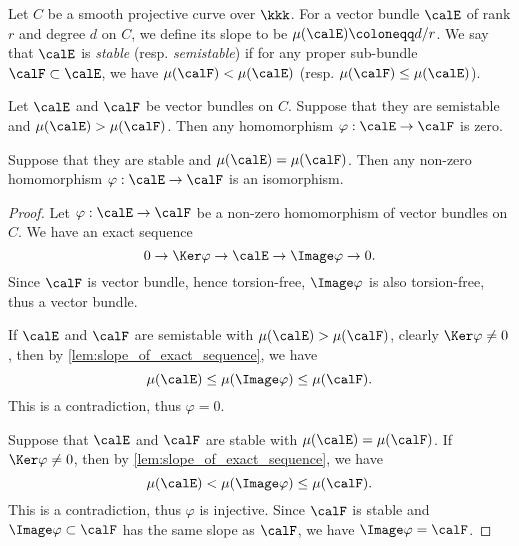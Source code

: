     \begin{definition}\label{def:stable_and_semistable_vector_bundles_over_curves}
        Let \(C\) be a smooth projective curve over \(\kkk\).
        For a vector bundle \(\calE\) of rank \(r\) and degree \(d\) on \(C\), we define its slope to be \(\mu(\calE) \coloneqq d/r\).
        We say that \(\calE\) is \emph{stable} (resp. \emph{semistable}) if for any proper sub-bundle \(\calF \subset \calE\), we have \(\mu(\calF) < \mu(\calE)\) (resp. \(\mu(\calF) \leq \mu(\calE)\)).
    \end{definition}

    \begin{proposition}\label{prop:homomorphism_between_semistable_and_stable_bundles}
        Let \(\calE\) and \(\calF\) be vector bundles on \(C\).
        Suppose that they are semistable and \(\mu(\calE) > \mu(\calF)\).
        Then any homomorphism \(\varphi : \calE \to \calF\) is zero.

        Suppose that they are stable and \(\mu(\calE) = \mu(\calF)\).
        Then any non-zero homomorphism \(\varphi : \calE \to \calF\) is an isomorphism.
    \end{proposition}
    \begin{proof}
        Let \(\varphi : \calE \to \calF\) be a non-zero homomorphism of vector bundles on \(C\).
        We have an exact sequence
        \[ 0 \to \Ker \varphi \to \calE \to \Image \varphi \to 0. \]
        Since \(\calF\) is vector bundle, hence torsion-free, \(\Image \varphi\) is also torsion-free, thus a vector bundle.

        If \(\calE\) and \(\calF\) are semistable with \(\mu(\calE) > \mu(\calF)\), 
        clearly \(\Ker \varphi \neq 0\), then by \cref{lem:slope_of_exact_sequence}, we have
        \[ \mu(\calE) \leq \mu(\Image \varphi) \leq \mu(\calF). \]
        This is a contradiction, thus \(\varphi = 0\).

        Suppose that \(\calE\) and \(\calF\) are stable with \(\mu(\calE) = \mu(\calF)\).
        If \(\Ker \varphi \neq 0\), then by \cref{lem:slope_of_exact_sequence}, we have
        \[ \mu(\calE) < \mu(\Image \varphi) \leq \mu(\calF). \]
        This is a contradiction, thus \(\varphi\) is injective.
        Since \(\calF\) is stable and \(\Image \varphi \subset \calF\) has the same slope as \(\calF\), we have \(\Image \varphi = \calF\).
    \end{proof}

